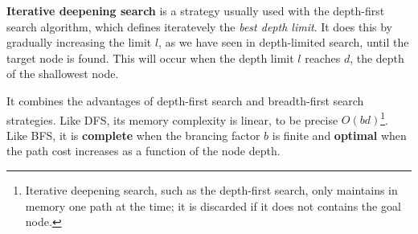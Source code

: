 \textbf{Iterative deepening search} is a strategy usually used with the depth-first search algorithm, which defines iteratevely the \textit{best depth limit}. It does this by 
gradually increasing the limit $l$, as we have seen in depth-limited search, until the target node is found. This will occur when the depth limit $l$ reaches $d$, the depth of the
shallowest node. \vspace{3.5pt}

It combines the advantages of depth-first search and breadth-first search strategies. Like DFS, its memory complexity is linear, to be precise $O(bd)$\footnote{Iterative deepening search, such as the depth-first search, only maintains in memory one path at the time; it is discarded if it does not contains the goal node.}. 
Like BFS, it is \textbf{complete} when the brancing factor $b$ is finite and \textbf{optimal} when the path cost increases as a function of the node depth. \vspace{3.5pt}


